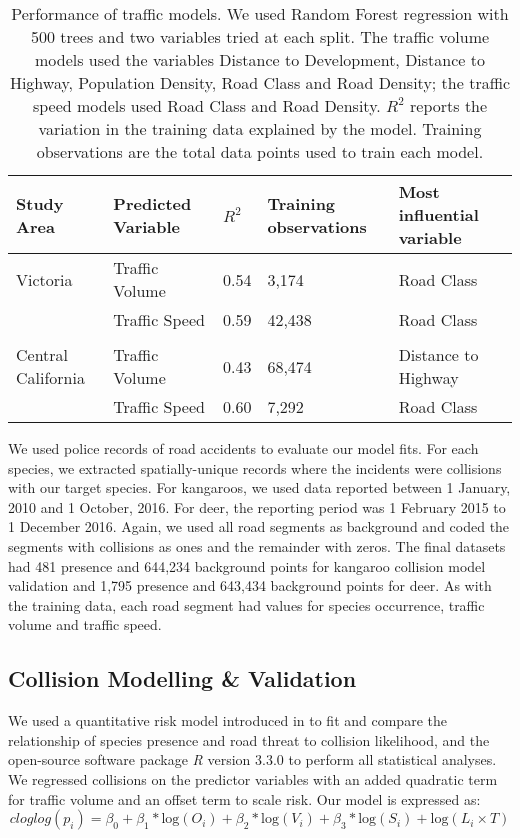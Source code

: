 \begin{table}[!h]
\caption[Performance of traffic models]{Performance of traffic models. We used Random Forest regression with 500 trees and two variables tried at each split. The traffic volume models used the variables Distance to Development, Distance to Highway, Population Density, Road Class and Road Density; the traffic speed models used Road Class and Road Density. $R^2$ reports the variation in the training data explained by the model. Training observations are the total data points used to train each model.}
\centering
\begin{tabularx}{0.9\textwidth}{@{}lllll@{}} \toprule
Study Area         	&Predicted Variable	& $R^2$	& Training observations		& Most influential variable \\ \midrule 
Victoria		 	& Traffic Volume	& 0.54 	& 3,174 					& Road Class \\ 
					& Traffic Speed		& 0.59	& 42,438 					& Road Class \\
&& \\ 
Central California	& Traffic Volume	& 0.43	& 68,474 					& Distance to Highway \\
			 		& Traffic Speed		& 0.60	& 7,292 					& Road Class \\
\bottomrule
\end{tabularx}
\label{cal_tmodel_perf}
\end{table}

We used police records of road accidents to evaluate our model fits.  For each species, we extracted spatially-unique records where the incidents were collisions with our target species.  For kangaroos, we used data reported between 1 January, 2010 and 1 October, 2016. For deer, the reporting period was 1 February 2015 to 1 December 2016.  Again, we used all road segments as background and coded the segments with collisions as ones and the remainder with zeros. The final datasets had 481 presence and 644,234 background points for kangaroo collision model validation and 1,795 presence and 643,434 background points for deer. As with the training data, each road segment had values for species occurrence, traffic volume and traffic speed.

\subsection{Collision Modelling \& Validation}

We used a quantitative risk model introduced in  to fit and compare the relationship of species presence and road threat to collision likelihood, and the open-source software package \textit{R} version 3.3.0 \citep{rdct16} to perform all statistical analyses. We regressed collisions on the predictor variables with an added quadratic term for traffic volume and an offset term to scale risk. Our model is expressed as:
\begin{equation} \label{eq:41}
cloglog(p_i) = \beta_0 + \beta_1*\text{log}(O_i) + \beta_2*\text{log}(V_i) + \beta_3*\text{log}(S_i) + \text{log}(L_i \times T)
\end{equation}

